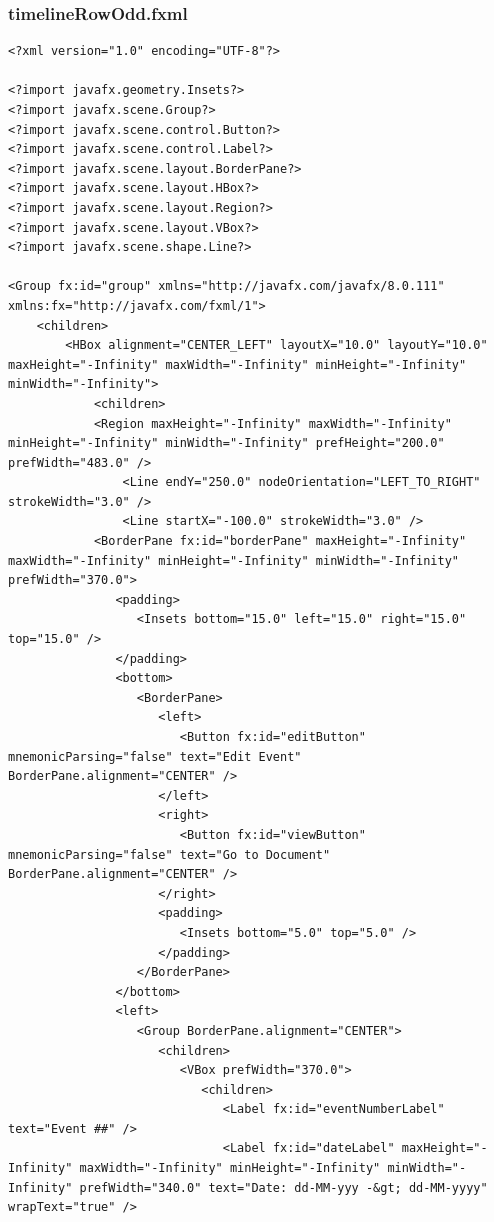 \subsubsection{timelineRowOdd.fxml}
\begin{lstlisting}
<?xml version="1.0" encoding="UTF-8"?>

<?import javafx.geometry.Insets?>
<?import javafx.scene.Group?>
<?import javafx.scene.control.Button?>
<?import javafx.scene.control.Label?>
<?import javafx.scene.layout.BorderPane?>
<?import javafx.scene.layout.HBox?>
<?import javafx.scene.layout.Region?>
<?import javafx.scene.layout.VBox?>
<?import javafx.scene.shape.Line?>

<Group fx:id="group" xmlns="http://javafx.com/javafx/8.0.111" xmlns:fx="http://javafx.com/fxml/1">
    <children>
        <HBox alignment="CENTER_LEFT" layoutX="10.0" layoutY="10.0" maxHeight="-Infinity" maxWidth="-Infinity" minHeight="-Infinity" minWidth="-Infinity">
            <children>
            <Region maxHeight="-Infinity" maxWidth="-Infinity" minHeight="-Infinity" minWidth="-Infinity" prefHeight="200.0" prefWidth="483.0" />
                <Line endY="250.0" nodeOrientation="LEFT_TO_RIGHT" strokeWidth="3.0" />
                <Line startX="-100.0" strokeWidth="3.0" />
            <BorderPane fx:id="borderPane" maxHeight="-Infinity" maxWidth="-Infinity" minHeight="-Infinity" minWidth="-Infinity" prefWidth="370.0">
               <padding>
                  <Insets bottom="15.0" left="15.0" right="15.0" top="15.0" />
               </padding>
               <bottom>
                  <BorderPane>
                     <left>
                        <Button fx:id="editButton" mnemonicParsing="false" text="Edit Event" BorderPane.alignment="CENTER" />
                     </left>
                     <right>
                        <Button fx:id="viewButton" mnemonicParsing="false" text="Go to Document" BorderPane.alignment="CENTER" />
                     </right>
                     <padding>
                        <Insets bottom="5.0" top="5.0" />
                     </padding>
                  </BorderPane>
               </bottom>
               <left>
                  <Group BorderPane.alignment="CENTER">
                     <children>
                        <VBox prefWidth="370.0">
                           <children>
                              <Label fx:id="eventNumberLabel" text="Event ##" />
                              <Label fx:id="dateLabel" maxHeight="-Infinity" maxWidth="-Infinity" minHeight="-Infinity" minWidth="-Infinity" prefWidth="340.0" text="Date: dd-MM-yyy -&gt; dd-MM-yyyy" wrapText="true" />

\end{lstlisting}

